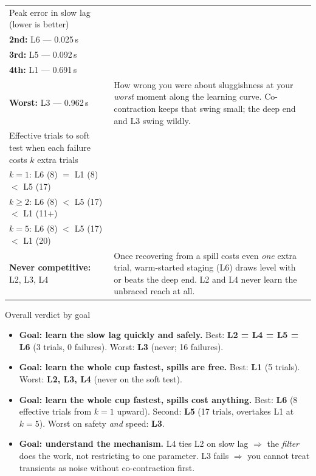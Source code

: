 \documentclass[11pt,a4paper]{article}
\begin{document}
\begin{longtable}{@{}p{2.6cm}p{5.8cm}p{5.8cm}@{}}
\addlinespace
Peak error in slow lag
(lower is better) &
\makecell[l]{%
\textbf{Best (tie):} L2, L4 --- 0.015\,s\\[2pt]
\textbf{2nd:} L6 --- 0.025\,s\\[2pt]
\textbf{3rd:} L5 --- 0.092\,s\\[2pt]
\textbf{4th:} L1 --- 0.691\,s\\[2pt]
\textbf{Worst:} L3 --- 0.962\,s} &
How wrong you were about sluggishness at your \emph{worst} moment along the
learning curve.  Co-contraction keeps that swing small; the deep end and
L3 swing wildly. \\
\addlinespace
Effective trials to soft test
when each failure costs $k$ extra trials &
\makecell[l]{%
$k=0$: L1 (5) $<$ L6 (8) $<$ L5 (17)\\[2pt]
$k=1$: L6 (8) $=$ L1 (8) $<$ L5 (17)\\[2pt]
$k\ge2$: L6 (8) $<$ L5 (17) $<$ L1 (11+)\\[2pt]
$k=5$: L6 (8) $<$ L5 (17) $<$ L1 (20)\\[2pt]
\textbf{Never competitive:} L2, L3, L4} &
Once recovering from a spill costs even \emph{one} extra trial, warm-started
staging (L6) draws level with or beats the deep end.  L2 and L4 never learn
the unbraced reach at all. \\
\bottomrule
\end{longtable}
\normalsize

\begin{resultbox}{Overall verdict by goal}
\begin{itemize}[nosep]
\item \textbf{Goal: learn the slow lag quickly and safely.}\;
  Best: \textbf{L2 = L4 = L5 = L6} (3 trials, 0 failures).\;
  Worst: \textbf{L3} (never; 16 failures).
\item \textbf{Goal: learn the whole cup fastest, spills are free.}\;
  Best: \textbf{L1} (5 trials).\;
  Worst: \textbf{L2, L3, L4} (never on the soft test).
\item \textbf{Goal: learn the whole cup fastest, spills cost anything.}\;
  Best: \textbf{L6} (8 effective trials from $k=1$ upward).\;
  Second: \textbf{L5} (17 trials, overtakes L1 at $k=5$).\;
  Worst on safety \emph{and} speed: \textbf{L3}.
\item \textbf{Goal: understand the mechanism.}\;
  L4 ties L2 on slow lag $\Rightarrow$ the \emph{filter} does the work, not
  restricting to one parameter.\;
  L3 fails $\Rightarrow$ you cannot treat transients as noise without
  co-contraction first.
\end{itemize}
\end{resultbox}
\end{document}
